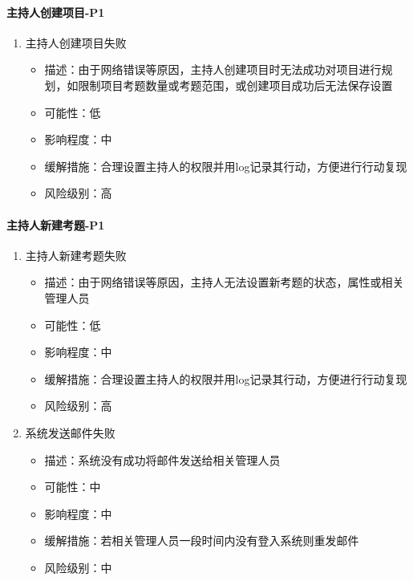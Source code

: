 \documentclass[hyperref, a4paper]{ctexart}
\providecommand{\tightlist}{%
  \setlength{\itemsep}{0pt}\setlength{\parskip}{0pt}}
\let\oldparagraph\paragraph
\renewcommand{\paragraph}[1]{\oldparagraph{#1}\mbox{}}
\begin{document}
\hypertarget{ux4e3bux6301ux4ebaux521bux5efaux9879ux76ee-p1}{%
\paragraph{主持人创建项目-P1}\label{ux4e3bux6301ux4ebaux521bux5efaux9879ux76ee-p1}}

\begin{enumerate}
\def\labelenumi{\arabic{enumi}.}
\tightlist
\item
  主持人创建项目失败

  \begin{itemize}
  \tightlist
  \item
    描述：由于网络错误等原因，主持人创建项目时无法成功对项目进行规划，如限制项目考题数量或考题范围，或创建项目成功后无法保存设置
  \item
    可能性：低
  \item
    影响程度：中
  \item
    缓解措施：合理设置主持人的权限并用log记录其行动，方便进行行动复现
  \item
    风险级别：高
  \end{itemize}
\end{enumerate}

\hypertarget{ux4e3bux6301ux4ebaux65b0ux5efaux8003ux9898-p1}{%
\paragraph{主持人新建考题-P1}\label{ux4e3bux6301ux4ebaux65b0ux5efaux8003ux9898-p1}}

\begin{enumerate}
\def\labelenumi{\arabic{enumi}.}
\tightlist
\item
  主持人新建考题失败

  \begin{itemize}
  \tightlist
  \item
    描述：由于网络错误等原因，主持人无法设置新考题的状态，属性或相关管理人员
  \item
    可能性：低
  \item
    影响程度：中
  \item
    缓解措施：合理设置主持人的权限并用log记录其行动，方便进行行动复现
  \item
    风险级别：高
  \end{itemize}
\item
  系统发送邮件失败

  \begin{itemize}
  \tightlist
  \item
    描述：系统没有成功将邮件发送给相关管理人员
  \item
    可能性：中
  \item
    影响程度：中
  \item
    缓解措施：若相关管理人员一段时间内没有登入系统则重发邮件
  \item
    风险级别：中
  \end{itemize}
\end{enumerate}
\end{document}
